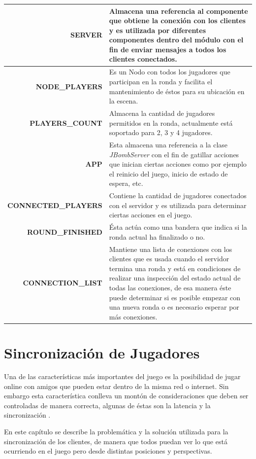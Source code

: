 \documentclass[a4paper,12pt,openany,oneside]{book}
\begin{document}
\begin{center}
\begin{tabular}{|r|p{10cm}|}
\hline
\textbf{SERVER} & Almacena una referencia al componente que obtiene la conexión con los clientes y es utilizada por diferentes componentes dentro del módulo con el fin de enviar mensajes a todos los clientes conectados.\\	
\hline
\textbf{NODE\_PLAYERS} & Es un Nodo con todos los jugadores que participan en la ronda y facilita el mantenimiento de éstos para su ubicación en la escena.\\	
\hline
\textbf{PLAYERS\_COUNT} & Almacena la cantidad de jugadores permitidos en la ronda, actualmente está soportado para 2, 3 y 4 jugadores.\\	
\hline
\textbf{APP} & Esta almacena una referencia a la clase \textit{JBombServer} con el fin de gatillar acciones que inician ciertas acciones como por ejemplo el reinicio del juego, inicio de estado de espera, etc.\\	
\hline
\textbf{CONNECTED\_PLAYERS} & Contiene la cantidad de jugadores conectados con el servidor y es utilizada para determinar ciertas acciones en el juego.\\	
\hline
\textbf{ROUND\_FINISHED} & Ésta actúa como una bandera que indica si la ronda actual ha finalizado o no.\\	
\hline
\textbf{CONNECTION\_LIST} & Mantiene una lista de conexiones con los clientes que es usada cuando el servidor termina una ronda y está en condiciones de realizar una inspección del estado actual de todas las conexiones, de esa manera éste puede determinar si es posible empezar con una nueva ronda o es necesario esperar por más conexiones.\\	
\hline
\end{tabular}
\end{center}
\chapter{Sincronización de Jugadores}
Una de las características más importantes del juego es la posibilidad de jugar online con amigos que pueden estar dentro de la misma red o internet. Sin embargo esta característica conlleva un montón de consideraciones que deben ser controladas de manera correcta, algunas de éstas son la latencia \cite{VALVE2} y la sincronización \cite{VALVE1}.

En este capítulo se describe la problemática y la solución utilizada para la sincronización de los clientes, de manera que todos puedan ver lo que está ocurriendo en el juego pero desde distintas posiciones y perspectivas.
\end{document}
